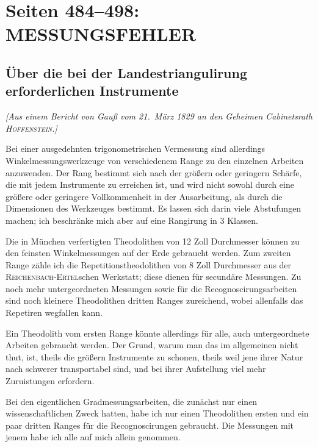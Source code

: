 \documentclass[12pt,a4paper]{article}
\theoremstyle{plain}
\theoremstyle{definition}
\theoremstyle{remark}
\begin{document}
\vfill
\eject


\section*{Seiten 484--498: MESSUNGSFEHLER}
\label{sec:messungsfehler}

\subsection*{\"Uber die bei der Landestriangulirung erforderlichen Instrumente}

\noindent
\textit{[Aus einem Bericht von Gau\ss{} vom 21.\ M\"arz 1829 an den Geheimen Cabinetsrath \textsc{Hoffenstein}.]}

\medskip

Bei einer ausgedehnten trigonometrischen Vermessung sind allerdings Winkelmessungswerkzeuge von verschiedenem Range zu den einzelnen Arbeiten anzuwenden. Der Rang bestimmt sich nach der gr\"o\ss ern oder geringern Sch\"arfe, die mit jedem Instrumente zu erreichen ist, und wird nicht sowohl durch eine gr\"o\ss ere oder geringere Vollkommenheit in der Ausarbeitung, als durch die Dimensionen des Werkzeuges bestimmt. Es lassen sich darin viele Abstufungen machen; ich beschr\"anke mich aber auf eine Rangirung in 3 Klassen.

Die in M\"unchen verfertigten Theodolithen von 12 Zoll Durchmesser k\"onnen zu den feinsten Winkelmessungen auf der Erde gebraucht werden. Zum zweiten Range z\"ahle ich die Repetitionstheodolithen von 8 Zoll Durchmesser aus der \textsc{Reichenbach-Ertel}schen Werkstatt; diese dienen f\"ur secund\"are Messungen. Zu noch mehr untergeordneten Messungen sowie f\"ur die Recognoscirungsarbeiten sind noch kleinere Theodolithen dritten Ranges zureichend, wobei allenfalls das Repetiren wegfallen kann.

Ein Theodolith vom ersten Range k\"onnte allerdings f\"ur alle, auch untergeordnete Arbeiten gebraucht werden. Der Grund, warum man das im allgemeinen nicht thut, ist, theils die gr\"o\ss ern Instrumente zu schonen, theils weil jene ihrer Natur nach schwerer transportabel sind, und bei ihrer Aufstellung viel mehr Zuruistungen erfordern.

Bei den eigentlichen Gradmessungsarbeiten, die zun\"achst nur einen wissenschaftlichen Zweck hatten, habe ich nur einen Theodolithen ersten und ein paar dritten Ranges f\"ur die Recognoscirungen gebraucht. Die Messungen mit jenem habe ich alle auf mich allein genommen.
\end{document}
